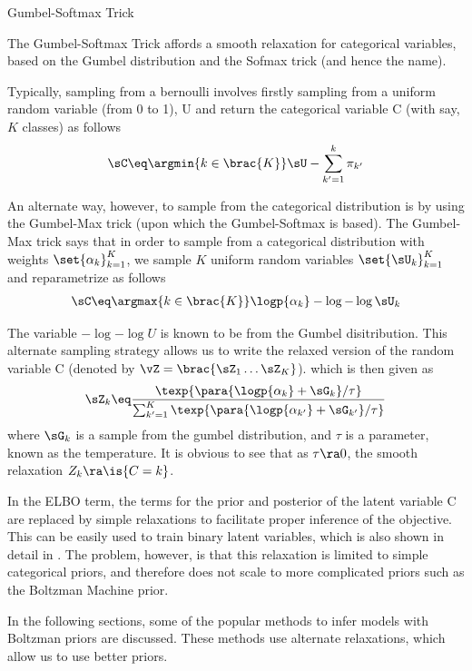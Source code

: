 \documentclass{article}
\begin{document}
\begin{psection}{Gumbel-Softmax Trick}

	The Gumbel-Softmax Trick \citep{concrete, gumbel} affords a smooth relaxation for categorical variables, based on the Gumbel distribution and the Sofmax trick (and hence the name).

	Typically, sampling from a bernoulli involves firstly sampling from a uniform random variable (from 0 to 1), U and return the categorical variable C (with say, $K$ classes) as follows
	\begin{align*}
		\sC \eq \argmin{k \in \brac{K}} \sU - \sum_{k' = 1}^k \pi_{k'}
	\end{align*}


	An alternate way, however, to sample from the categorical distribution is by using the Gumbel-Max trick (upon which the Gumbel-Softmax is based). The Gumbel-Max trick says that in order to sample from a categorical distribution with weights $\set{\alpha_k}_{k = 1}^K$, we sample $K$ uniform random variables $\set{\sU_k}_{k = 1}^{K}$ and reparametrize as follows
	\begin{align*}
		\sC \eq \argmax{k \in \brac{K}} \logp{\alpha_k} - \log{- \log{\sU_k}}
	\end{align*}

	The variable $-\log{-\log{U}}$ is known to be from the Gumbel disitribution. This alternate sampling strategy allows us to write the relaxed version of the random variable C (denoted by $\vZ = \brac{\sZ_1 \dots \sZ_K}$). which is then given as
	\begin{align*}
		\sZ_k \eq \frac{\texp{\para{\logp{\alpha_k} + \sG_k} / \tau}}{\sum_{k' = 1}^K \texp{\para{\logp{\alpha_{k'}} + \sG_{k'}} / \tau}}
	\end{align*}
	where $\sG_k$ is a sample from the gumbel distribution, and $\tau$ is a parameter, known as the temperature. It is obvious to see that as $\tau \ra 0$, the smooth relaxation $Z_k \ra \is{C = k}$.

	In the ELBO term, the terms for the prior and posterior of the latent variable C are replaced by simple relaxations to facilitate proper inference of the objective. This can be easily used to train binary latent variables, which is also shown in detail in \cite{concrete}. The problem, however, is that this relaxation is limited to simple categorical priors, and therefore does not scale to more complicated priors such as the Boltzman Machine prior.

	In the following sections, some of the popular methods to infer models with Boltzman priors are discussed. These methods use alternate relaxations, which allow us to use better priors.

\end{psection}
\end{document}

